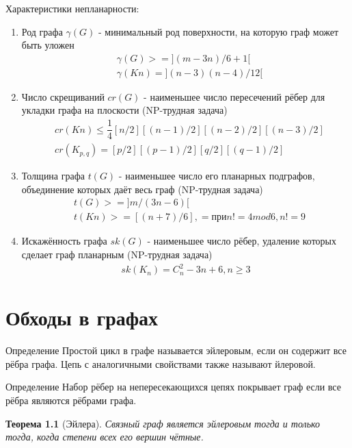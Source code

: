 \documentclass[a4paper,openany]{book}
\newcounter{TheoremCounter}
\newtheorem{theorem}[TheoremCounter]{Теорема}
\newenvironment{definition}
{\begin{statement}{Определение}}
    {\end{statement}}
\begin{document}
Характеристики непланарности:
\begin{enumerate}
  \item Род графа $\gamma(G)$ - минимальный род поверхности, на которую граф
  может быть уложен
  \begin{align*}
    &\gamma(G) >= ](m-3n)/6 + 1[\\
    &\gamma(Kn) = ](n-3)(n-4)/12[
  \end{align*}
  \item Число скрещиваний $cr(G)$ - наименьшее число пересечений рёбер для
  укладки графа на плоскости (NP-трудная задача)
  \begin{align*}
    &cr(Kn) \leqslant \dfrac{1}{4}[n/2] [(n-1)/2][(n-2)/2] [(n-3)/2]\\
    &cr(K_{p,q}) = [p/2] [(p-1)/2][q/2] [(q-1)/2]
  \end{align*}
  \item Толщина графа $t(G)$ - наименьшее число его планарных подграфов,
  объединение которых даёт весь граф (NP-трудная задача)
  \begin{align*}
    &t(G) >=]m/(3n-6)[\\
    &t(Kn) >= [(n+7)/6],   = при n != 4 mod 6, n != 9
  \end{align*}
  \item Искажённость графа $sk(G)$ - наименьшее число рёбер, удаление которых
  сделает граф планарным (NP-трудная задача)
  \begin{align*}
    sk(K_n) = C_n^2 - 3n + 6, n \geqslant 3
  \end{align*}
\end{enumerate}

\chapter{Обходы в графах}
\begin{definition}
  Простой цикл в графе называется эйлеровым, если он содержит все рёбра графа.
  Цепь с аналогичными свойствами также называют йлеровой.
\end{definition}
\begin{definition}
  Набор рёбер на непересекающихся цепях покрывает граф если все рёбра являются
  рёбрами графа.
\end{definition}

\begin{theorem}[Эйлера]
  Связный граф является эйлеровым тогда и только тогда, когда степени всех его
  вершин чётные.
\end{theorem}
\end{document}
